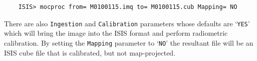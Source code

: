 \begin{verbatim}
    ISIS> mocproc from= M0100115.imq to= M0100115.cub Mapping= NO
\end{verbatim}

There are also \texttt{Ingestion} and \texttt{Calibration} parameters
whose defaults are `\texttt{YES}' which will bring the image into
the ISIS format and perform radiometric calibration.  By setting
the \texttt{Mapping} parameter to `\texttt{NO}' the resultant file
will be an ISIS cube file that is calibrated, but not map-projected.

% 
% 
% 
% 
% 
% 
% 
% 
% 
% 
% 
% 
